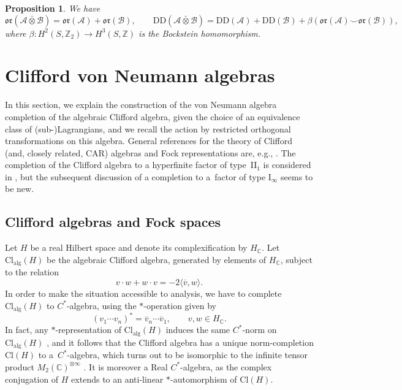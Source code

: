 \documentclass[pdftex]{sigma}
\numberwithin{equation}{section}
\newtheorem{Proposition}[Theorem]{Proposition}
\newcommand{\Z}{\mathbb{Z}}
\newcommand{\C}{\mathbb{C}}
\newcommand{\Cl}{\mathrm{Cl}}
\newcommand{\DD}{\mathrm{DD}}
\newcommand{\oclass}{\mathfrak{or}}
\begin{document}
\begin{Proposition} \label{PropTensorProductDD}
We have
\begin{equation*}
\oclass(\mathcal{A} \bar{\otimes}\mathcal{B}) = \oclass(\mathcal{A}) + \oclass(\mathcal{B}), \qquad \DD(\mathcal{A} \bar{\otimes}  \mathcal{B}) = \DD(\mathcal{A}) + \DD(\mathcal{B}) + \beta(\oclass(\mathcal{A}) \smile \oclass(\mathcal{B})),
\end{equation*}
where $\beta\colon H^2(S, \Z_2) \to H^3(S, \Z)$ is the Bockstein homomorphism.
\end{Proposition}

\section{Clifford von Neumann algebras}

In this section, we explain the construction of the von Neumann algebra completion of the algebraic Clifford algebra, given the choice of an equivalence class of (sub-)Lagrangians, and we recall the action by restricted orthogonal transformations on this algebra.
General references for the theory of Clifford (and, closely related, CAR) algebras and Fock representations are, e.g., \cite{Araki1,PlymenRobinson,PressleySegal,PreviatoSpera,ShaleStinespring,SperaWurzbacherSpinors,WurzbacherFermionicSecondQuantization}.
The completion of the Clifford algebra to a hyperfinite factor of type~II$_1$ is considered in \cite[Section~1.3]{PlymenRobinson}, but the subsequent discussion of a completion to a~factor of type I$_\infty$ seems to be new.

\subsection{Clifford algebras and Fock spaces} \label{SectionCliffordAlgebras}

Let $H$ be a real Hilbert space and denote its complexification by $H_\C$.
Let $\Cl_{\mathrm{alg}}(H)$ be the algebraic Clifford algebra, generated by elements of $H_\C$, subject to the relation
\begin{equation*}
 v \cdot w + w \cdot v = - 2 \langle \overline{v}, w\rangle.
\end{equation*}
In order to make the situation accessible to analysis, we have to complete $\Cl_{\mathrm{alg}}(H)$ to $C^*$-algebra, using the $*$-operation given by
\begin{equation*}
 (v_1\cdots v_n)^* = \overline{v}_n \cdots \overline{v}_1, \qquad v, w \in H_\C.
\end{equation*}
In fact, any $*$-representation of $\Cl_{\mathrm{alg}}(H)$ induces the same $C^*$-norm on $\Cl_{\mathrm{alg}}(H)$ \cite[Proposition~1]{ShaleStinespring}, and it follows that the Clifford algebra has a unique norm-completion $\Cl(H)$ to a~$C^*$-algebra, which turns out to be isomorphic to the infinite tensor product $M_2(\C)^{\otimes \infty}$ \cite{Araki1}.
It is moreover a Real $C^*$-algebra, as the complex conjugation of $H$ extends to an anti-linear $*$-automorphism of $\Cl(H)$.
\end{document}
